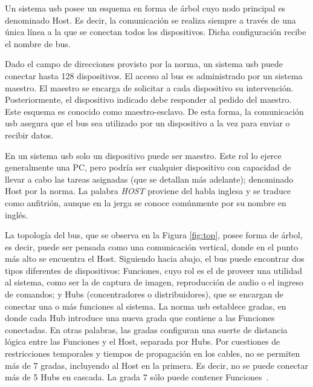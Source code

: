 Un sistema \acrshort{usb} posee un esquema %
en forma de árbol cuyo nodo principal es denominado Host. Es decir, la comunicación se realiza siempre a través de una única línea a la que se conectan todos los dispositivos. Dicha configuración recibe el nombre de bus. 

Dado el campo de direcciones provisto por la norma, un sistema \acrshort{usb} puede conectar hasta 128 dispositivos. El acceso al bus es administrado por un sistema maestro. El maestro se encarga de solicitar a cada dispositivo su intervención. Posteriormente, el dispositivo indicado debe responder al pedido del maestro. Este esquema es conocido como maestro-esclavo. De esta forma, la comunicación \acrshort{usb} asegura que el bus sea utilizado por un dispositivo a la vez para enviar o recibir datos.%

En un sistema \acrshort{usb} solo un dispositivo puede ser maestro. Este rol lo ejerce generalmente una PC, pero podría ser cualquier dispositivo con capacidad de llevar a cabo las tareas asignadas (que se detallan más adelante); denominado Host por la norma. La palabra {\it HOST} proviene del habla inglesa y se traduce como anfitrión, aunque en la jerga se conoce comúnmente por su nombre en inglés.%

La topología del bus, que se observa en la Figura \ref{fig:top}, posee forma de árbol, es decir, puede ser pensada como una comunicación vertical, donde en el punto más alto se encuentra el Host. Siguiendo hacia abajo, el bus puede encontrar dos tipos diferentes de dispositivos: Funciones, cuyo rol es el de proveer una utilidad al sistema, como ser la de captura de imagen, reproducción de audio o el ingreso de comandos; y Hubs (concentradores o distribuidores), que se encargan de conectar una o más funciones al sistema. La norma \acrshort{usb} establece gradas, en donde cada Hub introduce una nueva grada que contiene a las Funciones conectadas. En otras palabras, las gradas configuran una suerte de distancia lógica entre las Funciones y el Host, separada por Hubs. Por cuestiones de restricciones temporales y tiempos de propagación en los cables, no se permiten más de 7 gradas, incluyendo al Host en la primera. Es decir, no se puede conectar más de 5 Hubs en cascada. La grada 7 sólo puede contener Funciones~\cite{USBspec}.%

